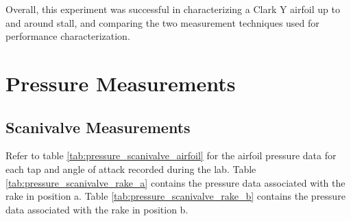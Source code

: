 \documentclass[runningheads]{llncs}
\begin{document}
\noindent
Overall, this experiment was successful in characterizing a Clark Y airfoil up to and around stall, and comparing the two measurement techniques used for performance characterization.










\appendix

\section{Pressure Measurements}

\subsection{Scanivalve Measurements}

\noindent
Refer to table \ref{tab:pressure_scanivalve_airfoil} for the airfoil pressure data for each tap and angle of attack recorded during the lab. Table \ref{tab:pressure_scanivalve_rake_a} contains the pressure data associated with the rake in position a. Table \ref{tab:pressure_scanivalve_rake_b} contains the pressure data associated with the rake in position b.
\end{document}
